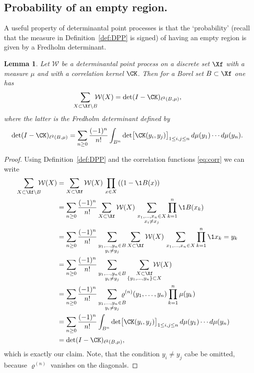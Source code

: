 \documentclass[]{pcmi}
\theoremstyle{plain}
\newtheorem{lemma}[equation]{Lemma}
\theoremstyle{definition}
\begin{document}
\subsection{Probability of an empty region.}

A useful property of determinantal point processes is that the `probability' (recall that the measure in Definition~\ref{def:DPP} is signed) of having an empty region is given by a Fredholm determinant.

\begin{lemma}\label{lem:GapProbability}
Let $\mathcal{W}$ be a determinantal point process on a discrete set $\Xf$ with a measure $\mu$ and with a correlation kernel $\CK$. Then for a Borel set $B \subset \Xf$ one has
\[
	\sum_{X \subset \Xf \setminus B} \hspace{-0.2cm} \mathcal{W}(X) = \det(I - \CK)_{\ell^2(B, \mu)},
\]
where the latter is the Fredholm determinant defined by
\begin{equation}\label{eq:Fredholm}
 \det(I - \CK)_{\ell^2(B, \mu)} = \sum_{n\geq 0}\frac{(-1)^n}{n!} \int_{B^n} \det \bigl[\CK(y_i,y_j)\bigr]_{1 \leq i,j \leq n}\, d\mu(y_1) \cdots d\mu(y_n).
\end{equation}
\end{lemma}

\begin{proof}
Using Definition~\ref{def:DPP} and the correlation functions \eqref{eq:corr} we can write
\begin{align*}
\sum_{X \subset \Xf \setminus B} \hspace{-0.2cm} \mathcal{W}(X) &= \sum_{X \subset \Xf} \mathcal{W}(X)\, \prod_{x \in X}\left((1-\1{B}(x)\right) \\
&= \sum_{n\geq 0} \frac{(-1)^n}{n!} \sum_{X \subset \Xf} \mathcal{W}(X)\, \sum_{\substack{x_1,\ldots,x_n \in X \\ x_i \neq x_j}}\prod_{k=1}^n\1{B}(x_{k})\\
&= \sum_{n\geq 0} \frac{(-1)^n}{n!} \sum_{\substack{y_1,\ldots,y_n \in B \\ y_i \neq y_j}} \sum_{X \subset \Xf} \mathcal{W}(X)\, \sum_{x_1,\ldots,x_n \in X}\prod_{k=1}^n\1{x_{k} = y_k}\\
&= \sum_{n\geq 0} \frac{(-1)^n}{n!} \sum_{\substack{y_1,\ldots,y_n \in B \\ y_i \neq y_j}} \sum_{\substack{X \subset \Xf \\ \{y_1,\ldots,y_n\} \subset X}} \hspace{-0.5cm} \mathcal{W}(X)\\
&=\sum_{n\geq 0}\frac{(-1)^n}{n!}\sum_{\substack{y_1,\ldots,y_n \in B \\ y_i \neq y_j}} \hspace{-0.3cm} \varrho^{(n)}(y_1,\ldots,y_n) \prod_{k=1}^n \mu(y_k)\\
&= \sum_{n\geq 0}\frac{(-1)^n}{n!}\int_{B^n} \det \bigl[\CK(y_i,y_j)\bigr]_{1 \leq i,j \leq n}\, d\mu(y_1) \cdots d\mu(y_n)\\
&= \det(I - \CK)_{\ell^2(B, \mu)},
\end{align*}
which is exactly our claim. Note, that the condition $y_i \neq y_j$ cabe be omitted, because $\varrho^{(n)}$ vanishes on the diagonals.
\end{proof}
\end{document}
